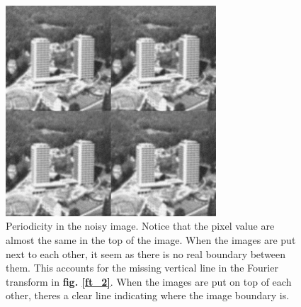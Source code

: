 \documentclass[a4paper, 10pt, final]{article}
\begin{document}
\begin{figure}[!h]
    \centering
    \includegraphics[angle=0,width=0.70\textwidth]{images/period}
    \caption[]{Periodicity in the noisy image. Notice that the pixel
    value are almost the same in the top of the image. When the images
    are put next to each other, it seem as there is no real boundary
    between them. This accounts for the missing vertical line in the
    Fourier transform in \textbf{fig. \ref{ft_2}}. When the images are
    put on top of each other, theres a clear line indicating where the
    image boundary is.}
    \label{period}
\end{figure}
\end{document}
